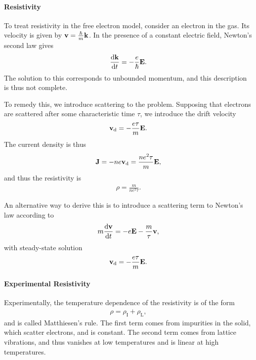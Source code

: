 \paragraph{Resistivity}
To treat resistivity in the free electron model, consider an electron in the gas. Its velocity is given by $\vb{v} = \frac{\hbar}{m}\vb{k}$. In the presence of a constant electric field, Newton's second law gives
\begin{align*}
	\dv{\vb{k}}{t} = -\frac{e}{\hbar}\vb{E}.
\end{align*}
The solution to this corresponds to unbounded momentum, and this description is thus not complete.

To remedy this, we introduce scattering to the problem. Supposing that electrons are scattered after some characteristic time $\tau$, we introduce the drift velocity
\begin{align*}
	\vb{v}_{\text{d}} = -\frac{e\tau}{m}\vb{E}.
\end{align*}
The current density is thus
\begin{align*}
	\vb{J} = -ne\vb{v}_{\text{d}} = \frac{ne^{2}\tau}{m}\vb{E},
\end{align*}
and thus the resistivity is
\begin{align*}
	\rho = \frac{m}{ne^{2}\tau}.
\end{align*}

An alternative way to derive this is to introduce a scattering term to Newton's law according to
\begin{align*}
	m\dv{\vb{v}}{t} = -e\vb{E} - \frac{m}{\tau}\vb{v},
\end{align*}
with steady-state solution
\begin{align*}
	\vb{v}_{\text{d}} = -\frac{e\tau}{m}\vb{E}.
\end{align*}

\paragraph{Experimental Resistivity}
Experimentally, the temperature dependence of the resistivity is of the form
\begin{align*}
	\rho = \rho_{\text{I}} + \rho_{\text{L}},
\end{align*}
and is called Matthiesen's rule. The first term comes from impurities in the solid, which scatter electrons, and is constant. The second term comes from lattice vibrations, and thus vanishes at low temperatures and is linear at high temperatures.

